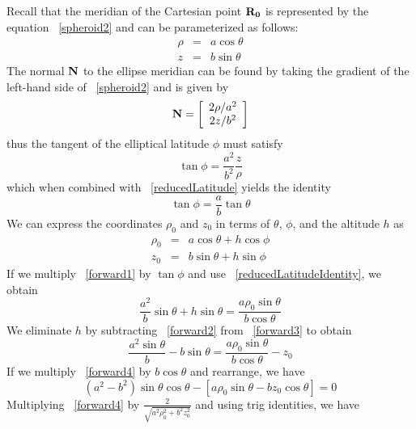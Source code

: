 \documentclass[twoside,11pt,titlepage]{report}
\begin{document}
Recall that the meridian of the Cartesian point $\bf{R_0}$ is represented by the equation ~\ref{spheroid2}
and can be parameterized as follows:
\begin{eqnarray}
\rho & = & a\cos \theta \nonumber \\
z & = & b\sin \theta
\label{reducedLatitude}
\end{eqnarray}
The normal $\bf{N}$ to the ellipse meridian can be found by taking the gradient of the left-hand side of ~\ref{spheroid2} and is given by
\begin{equation}
\bf{N} = \left[\begin{array}{c} 2\rho/a^2 \\ 2z/b^2 \end{array}\right]
\label{normal}
\end{equation}
\noindent thus the tangent of the elliptical latitude $\phi$ must satisfy
\begin{equation}
\tan \phi = \frac{a^2}{b^2}\frac{z}{\rho}
\label{tanPhi}
\end{equation}
\noindent which when combined with ~\ref{reducedLatitude} yields the identity
\begin{equation}
\tan \phi = \frac{a}{b}\tan \theta
\label{reducedLatitudeIdentity}
\end{equation}
We can express the coordinates $\rho_0$ and $z_0$ in terms of $\theta$, $\phi$, and the altitude $h$ as
\begin{eqnarray}
\rho_0 & = & a\cos \theta + h\cos\phi
\label{forward1} \\
z_0 & = & b\sin\theta + h\sin\phi
\label{forward2}
\end{eqnarray}
If we multiply ~\ref{forward1} by $\tan\phi$ and use ~\ref{reducedLatitudeIdentity}, we obtain
\begin{equation}
\frac{a^2}{b}\sin\theta + h\sin\theta = \frac{a\rho_0\sin\theta}{b\cos\theta}
\label{forward3}
\end{equation}
We eliminate $h$ by subtracting ~\ref{forward2} from ~\ref{forward3} to obtain
\begin{equation}
\frac{a^2\sin\theta}{b} - b\sin\theta = \frac{a\rho_0\sin\theta}{b\cos\theta} - z_0
\label{forward4}
\end{equation}
If we multiply ~\ref{forward4} by $b\cos\theta$ and rearrange, we have
\begin{equation}
(a^2-b^2)\sin\theta\cos\theta - \left[a\rho_0\sin\theta - bz_0\cos\theta\right] = 0
\label{thetaEquation1}
\end{equation}
Multiplying ~\ref{forward4} by $\frac{2}{\sqrt{a^2\rho_0^2 + b^2z_0^2}}$ and using trig identities, we have
\end{document}
